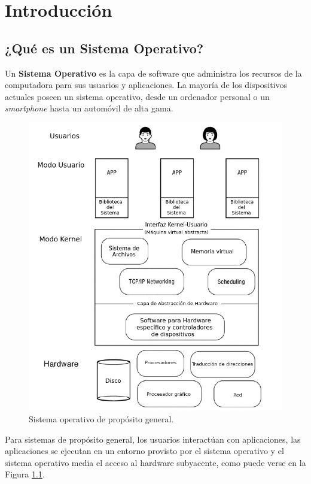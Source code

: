 \documentclass[10pt]{book}
\begin{document}
\chapter{Introducción}

\section{¿Qué es un Sistema Operativo?}
Un \textbf{Sistema Operativo} es la capa de software que administra los recursos de la computadora para sus usuarios y aplicaciones. La mayoría de los dispositivos actuales poseen un sistema operativo, desde un ordenador personal o un \textit{smartphone} hasta un automóvil de alta gama.

\begin{figure}[tbhp]
\centerline{\includegraphics[scale=0.70]{img/fig01}}
\caption{Sistema operativo de propósito general.}
\label{fig01}
\end{figure}

Para sistemas de propósito general, los usuarios interactúan con aplicaciones, las aplicaciones se ejecutan en un entorno provisto por el sistema operativo y el sistema operativo media el acceso al hardware subyacente, como puede verse en la Figura \ref{fig01}.
\end{document}
